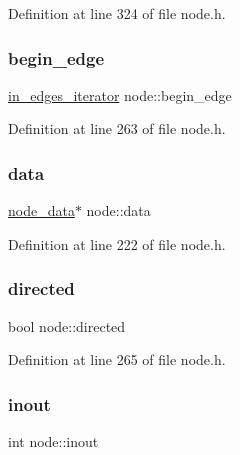 Definition at line 324 of file node.\+h.

\mbox{\label{classnode_a2774efbd986e9e126c0bc5cb60523ff9}} 
\subsubsection{\texorpdfstring{begin\+\_\+edge}{begin\_edge}}
{\footnotesize\ttfamily \mbox{\hyperlink{classnode_a9a96be92add7c1a2771bcd0431ebf8ab}{in\+\_\+edges\+\_\+iterator}} node\+::begin\+\_\+edge\hspace{0.3cm}{\ttfamily [private]}}



Definition at line 263 of file node.\+h.

\mbox{\label{classnode_a4ae3d54ebb61be3a102bedf5b91bef75}} 
\subsubsection{\texorpdfstring{data}{data}}
{\footnotesize\ttfamily \mbox{\hyperlink{classnode__data}{node\+\_\+data}}$\ast$ node\+::data\hspace{0.3cm}{\ttfamily [private]}}



Definition at line 222 of file node.\+h.

\mbox{\label{classnode_ab1b38276f1b8ca748cf1d95be98201c1}} 
\subsubsection{\texorpdfstring{directed}{directed}}
{\footnotesize\ttfamily bool node\+::directed\hspace{0.3cm}{\ttfamily [private]}}



Definition at line 265 of file node.\+h.

\mbox{\label{classnode_a2cfc899adde47c9ce3a6d6610a369e23}} 
\subsubsection{\texorpdfstring{inout}{inout}}
{\footnotesize\ttfamily int node\+::inout\hspace{0.3cm}{\ttfamily [private]}}



